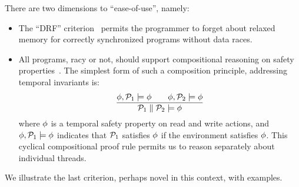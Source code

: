 There are two dimensions to ``ease-of-use'', namely:
\begin{itemize}
\item The ``DRF'' criterion~\cite{DBLP:journals/tpds/AdveH93, DBLP:conf/isca/AdveH90} permits the programmer to forget about relaxed memory for correctly synchronized programs without data races.  

\item All programs, racy or not,  should support compositional reasoning on safety properties~\cite{PnueliSafety,Misra:1981:PNP:1313338.1313770,StarkSafety,Abadi:1993:CS:151646.151649}.  The simplest form of such a composition principle, addressing temporal invariants is:
\[
  \frac{
      \phi, \mathcal{P}_1 \models\phi
      \qquad
      \phi, \mathcal{P}_2 \models\phi
    }{\mathcal{P}_1 \parallel \mathcal{P}_2 \models \phi}
\]
where $\phi$ is a temporal safety property on read and write actions, and $\phi, \mathcal{P}_1 \models\phi$ indicates that $\mathcal{P}_1$ satisfies $\phi$ if the environment satisfies $\phi$.  This cyclical compositional proof rule permits us to reason separately about individual threads. 
\end{itemize}
We illustrate the last criterion, perhaps novel in this context, with examples.   
